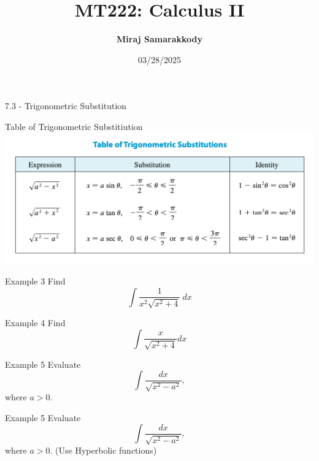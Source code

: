 \documentclass{beamer}
\title{MT222: Calculus II}
\author{\textbf{Miraj Samarakkody}}
\institute{Tougaloo College}
\date{03/28/2025}
\begin{document}
\begin{frame}
    \titlepage
\end{frame}




\begin{frame}{}
    \begin{center}
        \Huge{7.3 - Trigonometric Substitution}
    \end{center}
    
\end{frame}



\begin{frame}{Table of Trigonometric Substitiution}
    \includegraphics[scale=0.6]{figures/fig_1.png}
\end{frame}


\begin{frame}{Example 3}
    Find \[\int \dfrac{1}{x^2 \sqrt{x^2+4}}~dx\]
\end{frame}

\begin{frame}{Example 4}
    Find \[\int \dfrac{x}{\sqrt{x^2+4}}dx\]
\end{frame}

\begin{frame}{Example 5}
    Evaluate \[\int \dfrac{dx}{\sqrt{x^2-a^2}},\] where \(a>0\).
    
\end{frame}

\begin{frame}{Example 5}
    Evaluate \[\int \dfrac{dx}{\sqrt{x^2-a^2}},\] where \(a>0\). (Use Hyperbolic functions)
    
\end{frame}
\end{document}
